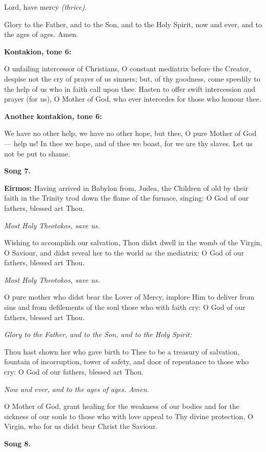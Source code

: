Lord, have mercy 
\emph{(thrice).}

Glory to the Father, and to the Son, and to the Holy Spirit, now and ever, and to the ages of ages. Amen.

\textbf{Kontakion, tone 6:}

O unfailing intercessor of Christians, O constant mediatrix before the Creator, despise not the cry of prayer of us sinners; 
but, of thy goodness, come speedily to the help of us who in faith call upon thee.
Hasten to offer swift intercession and prayer (for us), O Mother of God, who ever intercedes for those who honour thee.

\textbf{Another kontakion, tone 6:}

We have no other help, we have no other hope, but thee, O pure Mother of God--- help us! 
In thee we hope, and of thee we boast, for we are thy slaves. 
Let us not be put to shame.

\textbf{Song 7.}

\textbf{Eirmos:} 
Having arrived in Babylon from, Judea, the Children of old by their faith in the Trinity trod down the flame of the furnace, singing: 
O God of our fathers, blessed art Thou.

\emph{Most Holy Theotokos, save us.}

Wishing to accomplish our salvation, Thou didst dwell in the womb of the Virgin, O Saviour, and didst reveal her to the world as the mediatrix: 
O God of our fathers, blessed art Thou.

\emph{Most Holy Theotokos, save us.}

O pure mother who didst bear the Lover of Mercy, implore Him to deliver from sins and from defilements of the soul those who with faith cry: 
O God of our fathers, blessed art Thou.

\emph{Glory to the Father, and to the Son, and to the Holy Spirit:}

Thou hast shown her who gave birth to Thee to be a treasury of salvation, fountain of incorruption, tower of safety, and door of repentance to those who cry: 
O God of our fathers, blessed art Thou.

\emph{Now and ever, and to the ages of ages. Amen.}

O Mother of God, grant healing for the weakness of our bodies and for the sickness of our souls to those who with love appeal to Thy divine protection, O Virgin, who for us didst bear Christ the Saviour.

\textbf{Song 8.}


